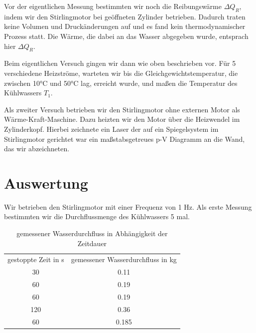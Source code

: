 \documentclass[a4paper, 12pt,]{scrartcl}
\begin{document}
Vor der eigentlichen Messung bestimmten wir noch die Reibungswärme $\Delta{Q_R}$, indem wir den Stirlingmotor bei geöffneten Zylinder betrieben. Dadurch traten keine Volumen und Druckänderungen auf und es fand kein thermodynamischer Prozess statt. Die Wärme, die dabei an das Wasser abgegeben wurde, entsprach hier $\Delta{Q_R}$.

Beim eigentlichen Versuch gingen wir dann wie oben beschrieben vor. Für 5 verschiedene Heizströme, warteten wir bis die Gleichgewichtstemperatur, die zwischen 10°C und 50°C lag, erreicht wurde, und maßen die Temperatur des Kühlwassers $T_1$.

Als zweiter Versuch betrieben wir den Stirlingmotor ohne externen Motor als Wärme-Kraft-Maschine. Dazu heizten wir den Motor über die Heizwendel im Zylinderkopf. Hierbei zeichnete ein Laser der auf ein Spiegelsystem im Stirlingmotor gerichtet war ein maßstabsgetreues p-V Diagramm an die Wand, das wir abzeichneten.

\section{Auswertung}
Wir betrieben den Stirlingmotor mit einer Frequenz von 1 Hz. Als erste Messung bestimmten wir die Durchflussmenge des Kühlwassers 5 mal.
\begin{table}[H]\centering\begin{tabular}{cc}gestoppte Zeit in s&gemessener Wasserdurchfluss in kg\\30&0.11\\60&0.19\\60&0.19\\120&0.36\\60&0.185\end{tabular}\caption{gemessener Wasserdurchfluss in Abhängigkeit der Zeitdauer}\end{table}
\end{document}
